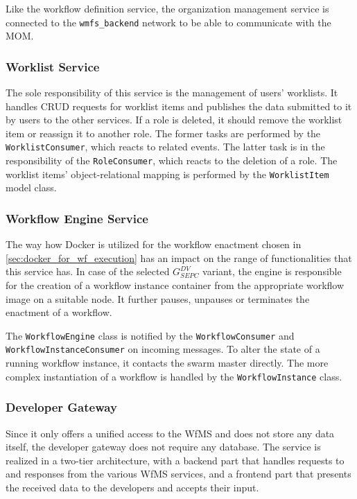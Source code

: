     Like the workflow definition service, the organization management service is connected to the \texttt{wmfs\_backend} network to be able to communicate with the \ac{MOM}.

  \subsubsection{Worklist Service} %
    \label{subs:worklist_service}
    The sole responsibility of this service is the management of users' worklists. It handles \ac{CRUD} requests for worklist items and publishes the data submitted to it by users to the other services. If a role is deleted, it should remove the worklist item or reassign it to another role. The former tasks are performed by the \texttt{WorklistConsumer}, which reacts to related events. The latter task is in the responsibility of the \texttt{RoleConsumer}, which reacts to the deletion of a role. The worklist items' object-relational mapping is performed by the \texttt{WorklistItem} model class.

  \subsubsection{Workflow Engine Service} %
    \label{subs:workflow_engine_service}
    The way how Docker is utilized for the workflow enactment chosen in \ref{sec:docker_for_wf_execution} has an impact on the range of functionalities that this service has. In case of the selected $G_{SEPC}^{DV}$ variant, the engine is responsible for the creation of a workflow instance container from the appropriate workflow image on a suitable node. It further pauses, unpauses or terminates the enactment of a workflow.

    The \texttt{WorkflowEngine} class is notified by the \texttt{WorkflowConsumer} and \texttt{WorkflowInstanceConsumer} on incoming messages. To alter the state of a running workflow instance, it contacts the swarm master directly. The more complex instantiation of a workflow is handled by the \texttt{WorkflowInstance} class.


  \subsubsection{Developer Gateway} %
    \label{subs:developer_gateway}
    Since it only offers a unified access to the \ac{WfMS} and does not store any data itself, the developer gateway does not require any database. The service is realized in a two-tier architecture, with a backend part that handles requests to and responses from the various \ac{WfMS} services, and a frontend part that presents the received data to the developers and accepts their input.

